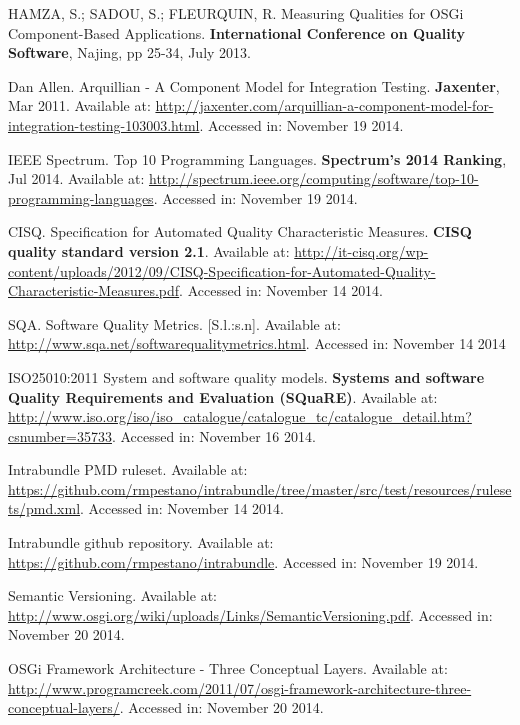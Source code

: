 \documentclass[cic,tc,english]{iiufrgs} %
\begin{document}
\begin{thebibliography}{este-parametro-nao-eh-usado-pelo-estilo-ABNT}
 HAMZA, S.; SADOU, S.; FLEURQUIN, R.
Measuring Qualities for OSGi Component-Based Applications. \textbf{International Conference on Quality Software}, Najing, pp 25-34, July 2013.

 Dan Allen.
Arquillian - A Component Model for Integration Testing. \textbf{Jaxenter}, Mar 2011. 
Available at: \url{http://jaxenter.com/arquillian-a-component-model-for-integration-testing-103003.html}. Accessed in: November 19 2014.

 IEEE Spectrum.
Top 10 Programming Languages. \textbf{Spectrum’s 2014 Ranking}, Jul 2014. Available at: \url{http://spectrum.ieee.org/computing/software/top-10-programming-languages}. Accessed in: November 19 2014. 


 CISQ.
Specification for Automated Quality Characteristic Measures. \textbf{CISQ quality standard version 2.1}. Available at: \url{http://it-cisq.org/wp-content/uploads/2012/09/CISQ-Specification-for-Automated-Quality-Characteristic-Measures.pdf}. Accessed in: November 14 2014.

 SQA.
Software Quality Metrics. [S.l.:s.n]. Available at: \url{http://www.sqa.net/softwarequalitymetrics.html}. Accessed in: November 14 2014

 ISO25010:2011
System and software quality models. \textbf{Systems and software Quality Requirements and Evaluation (SQuaRE)}. Available at: \url{http://www.iso.org/iso/iso_catalogue/catalogue_tc/catalogue_detail.htm?csnumber=35733}. Accessed in: November 16 2014.

Intrabundle PMD ruleset. Available at: \url{https://github.com/rmpestano/intrabundle/tree/master/src/test/resources/rulesets/pmd.xml}. Accessed in: November 14 2014.

Intrabundle github repository. Available at: \url{https://github.com/rmpestano/intrabundle}. Accessed in: November 19 2014.

Semantic Versioning. Available at: \url{http://www.osgi.org/wiki/uploads/Links/SemanticVersioning.pdf}. Accessed in: November 20 2014.

OSGi Framework Architecture - Three Conceptual Layers. Available at: \url{http://www.programcreek.com/2011/07/osgi-framework-architecture-three-conceptual-layers/}. Accessed in: November 20 2014.


\end{thebibliography}
\end{document}
